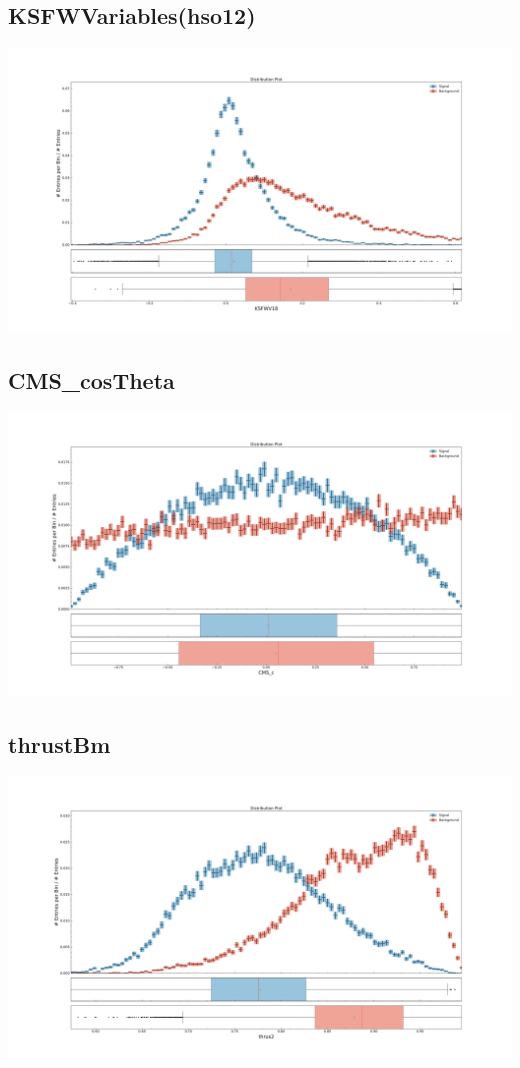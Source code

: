 \documentclass[10pt,a4paper]{article}
\begin{document}
\subsection{KSFWVariables(hso12)}
\begin{center}
\includegraphics[width=1.0\textwidth]{variable_-5393795410102118418.pdf}
\end{center}
\subsection{CMS\_cosTheta}
\begin{center}
\includegraphics[width=1.0\textwidth]{variable_3296739436538768773.pdf}
\end{center}
\subsection{thrustBm}
\begin{center}
\includegraphics[width=1.0\textwidth]{variable_-1290201519125044990.pdf}
\end{center}
\end{document}
